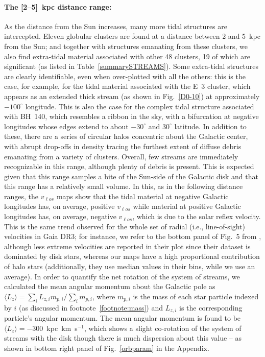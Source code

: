     \paragraph{The [2--5]~kpc distance range: }
    As the distance from the Sun increases, many more tidal structures are intercepted. Eleven globular clusters are found at a distance between 2 and 5~kpc from the Sun; and together with structures emanating from these clusters, we also find extra-tidal material associated with other 48 clusters, 19 of which are significant (as listed in Table~\ref{summarySTREAMS}). Some extra-tidal structures are clearly identifiable, even when over-plotted with all the others: this is the case, for example, for the tidal material associated with the E~3 cluster, which appears as an extended thick stream (as shown in Fig.~\ref{D0-10}) at approximately $-100^{\circ}$ longitude. This is also the case for the complex tidal structure associated with BH~140, which resembles a ribbon in the sky, with a bifurcation at negative longitudes whose edges extend to about $-30^\circ$ and $30^\circ$ latitude. In addition to these, there are a series of circular halos concentric about the Galactic center, with abrupt drop-offs in density tracing the furthest extent of diffuse debris emanating from a variety of clusters. Overall, few streams are immediately recognizable in this range, although plenty of debris is present. This is expected given that this range samples a bite of the Sun-side of the Galactic disk and that this range has a relatively small volume. In this, as in the following distance ranges, the $v_{\ell os}$ maps show that the tidal material at negative Galactic longitudes has, on average, positive $v_{\ell os}$ while material at positive Galactic longitudes has, on average, negative $v_{\ell os}$, which is due to the solar reflex velocity. This is the same trend observed for the whole set of radial (i.e., line-of-sight) velocities in Gaia DR3; for instance, we refer to the bottom panel of Fig.~5 from \citet{2023A&A...674A...5K}, although less extreme velocities are reported in their plot since their dataset is dominated by disk stars, whereas our maps have a high proportional contribution of halo stars (additionally, they use median values in their bins, while we use an average). In order to quantify the net rotation of the system of streams, we calculated the mean angular momentum about the Galactic pole as $\langle L_z \rangle =\sum_i L_{z,i} m_{p,i} / \sum_i m_{p,i} $, where $m_{p,i}$ is the mass of each star particle indexed by $i$ (as discussed in footnote~\ref{footnote:mass}) and $L_{z,i}$ is the corresponding particle's angular momentum. The mean angular momentum is found to be $\langle L_z \rangle =-300$~kpc~km~s$^{-1}$, which shows a slight co-rotation of the system of streams with the disk though there is much dispersion about this value -- as shown in bottom right panel of Fig.~\ref{orbparam} in the Appendix.


